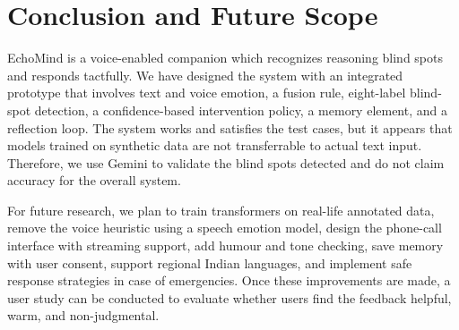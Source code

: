 \documentclass[conference]{IEEEtran}
\begin{document}
\section{Conclusion and Future Scope}
EchoMind is a voice-enabled companion which recognizes reasoning blind spots and responds tactfully. We have designed the system with an integrated prototype that involves text and voice emotion, a fusion rule, eight-label blind-spot detection, a confidence-based intervention policy, a memory element, and a reflection loop. The system works and satisfies the test cases, but it appears that models trained on synthetic data are not transferrable to actual text input. Therefore, we use Gemini to validate the blind spots detected and do not claim accuracy for the overall system.

For future research, we plan to train transformers on real-life annotated data, remove the voice heuristic using a speech emotion model, design the phone-call interface with streaming support, add humour and tone checking, save memory with user consent, support regional Indian languages, and implement safe response strategies in case of emergencies. Once these improvements are made, a user study can be conducted to evaluate whether users find the feedback helpful, warm, and non-judgmental.
\end{document}
